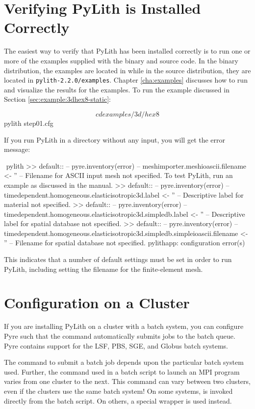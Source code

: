 \section{Verifying PyLith is Installed Correctly}

The easiest way to verify that PyLith has been installed correctly is
to run one or more of the examples supplied with the binary and source
code. In the binary distribution, the examples are located in
 while in the source distribution,
they are located in \texttt{pylith-2.2.0/examples}. Chapter
\vref{cha:examples} discusses how to run and visualize the results
for the examples. To run the example discussed in Section
\vref{sec:example:3dhex8-static}:
\begin{shell}
$$ cd examples/3d/hex8
$$ pylith step01.cfg
\end{shell}
If you run PyLith in a directory without any input, you will get the
error message:
\begin{shell}
$$ pylith
 >> {default}::
 -- pyre.inventory(error)
 -- meshimporter.meshioascii.filename <- ''
 -- Filename for ASCII input mesh not specified.
    To test PyLith, run an example as discussed in the manual.
 >> {default}::
 -- pyre.inventory(error)
 -- timedependent.homogeneous.elasticisotropic3d.label <- ''
 -- Descriptive label for material not specified.
 >> {default}::
 -- pyre.inventory(error)
 -- timedependent.homogeneous.elasticisotropic3d.simpledb.label <- ''
 -- Descriptive label for spatial database not specified.
 >> {default}::
 -- pyre.inventory(error)
 -- timedependent.homogeneous.elasticisotropic3d.simpledb.simpleioascii.filename <- ''
 -- Filename for spatial database not specified.
pylithapp: configuration error(s)
\end{shell}
This indicates that a number of default settings must be set in order
to run PyLith, including setting the filename for the finite-element
mesh.


\section{Configuration on a Cluster}

If you are installing PyLith on a cluster with a batch system, you can
configure Pyre such that the  command automatically
submits jobs to the batch queue. Pyre contains support for the LSF,
PBS, SGE, and Globus batch systems.

The command to submit a batch job depends upon the particular batch
system used. Further, the command used in a batch script to launch an
MPI program varies from one cluster to the next. This command can vary
between two clusters, even if the clusters use the same batch system!
On some systems,  is invoked directly from the batch
script. On others, a special wrapper is used instead.

